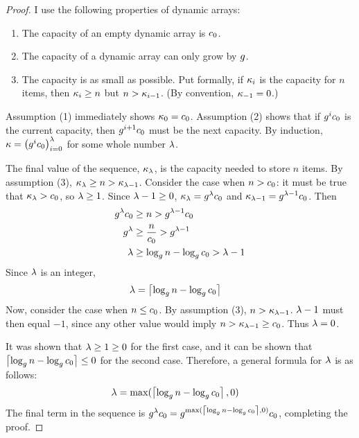 \begin{proof}
	I use the following properties of dynamic arrays:
	\begin{enumerate}
		\item The capacity of an empty dynamic array is $c_0$.
		\item The capacity of a dynamic array can only grow by $g$.
		\item The capacity is as small as possible. Put formally, if $\kappa_i$ is the capacity for $n$ items, then $\kappa_i \geq n$ but $n > \kappa_{i - 1}$. (By convention, $\kappa_{-1} = 0$.)
	\end{enumerate}
	Assumption (1) immediately shows $\kappa_0 = c_0$. Assumption (2) shows that if $g^ic_0$ is the current capacity, then $g^{i + 1}c_0$ must be the next capacity. By induction, $\kappa = \left( g^ic_0 \right)_{i = 0}^\lambda$ for some whole number $\lambda$.
	
	The final value of the sequence, $\kappa_\lambda$, is the capacity needed to store $n$ items. By assumption (3), $\kappa_\lambda \geq n > \kappa_{\lambda - 1}$. Consider the case when $n > c_0$: it must be true that $\kappa_\lambda > c_0$, so $\lambda \geq 1$. Since $\lambda - 1 \geq 0$, $\kappa_\lambda = g^\lambda c_0$ and $\kappa_{\lambda - 1} = g^{\lambda - 1}c_0$. Then
	\begin{align*}
	g^\lambda c_0 &\geq n > g^{\lambda - 1}c_0\\
	g^\lambda &\geq \frac{n}{c_0} > g^{\lambda - 1}\\
	\lambda &\geq \log_{g} n - \log_{g} c_0 > \lambda - 1\\
	\end{align*}
	Since $\lambda$ is an integer,
	\begin{align*}
	\lambda &= \left\lceil \log_{g} n - \log_{g} c_0 \right\rceil
	\end{align*}
	Now, consider the case when $n \leq c_0$. By assumption (3), $n > \kappa_{\lambda - 1}$. $\lambda - 1$ must then equal $-1$, since any other value would imply $n > \kappa_{\lambda - 1} \geq c_0$. Thus $\lambda = 0$.
	
	It was shown that $\lambda \geq 1 \geq 0$ for the first case, and it can be shown that $\left\lceil \log_{g} n - \log_{g} c_0 \right\rceil \leq 0$ for the second case. Therefore, a general formula for $\lambda$ is as follows:
	\begin{align*}
	\lambda &= \max(\left\lceil \log_{g} n - \log_{g} c_0 \right\rceil, 0)
	\end{align*}
	The final term in the sequence is $g^\lambda c_0 = g^{\max(\left\lceil \log_{g} n - \log_{g} c_0 \right\rceil, 0)}c_0$, completing the proof.
\end{proof}

